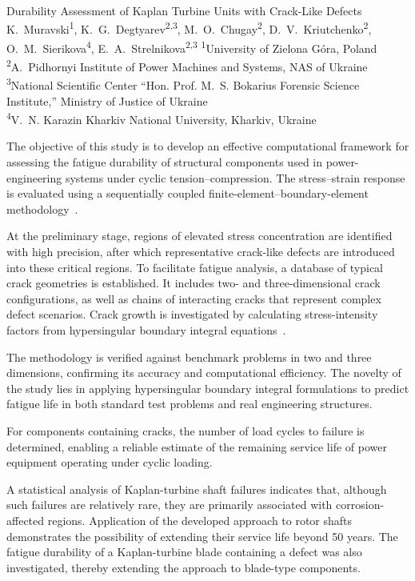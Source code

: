 \ReportHeading
  {Durability Assessment of Kaplan Turbine Units with Crack-Like Defects}
  {K.~Muravski\textsuperscript{1}, K.~G.~Degtyarev\textsuperscript{2,3}, M.~O.~Chugay\textsuperscript{2}, D.~V.~Kriutchenko\textsuperscript{2}, O.~M.~Sierikova\textsuperscript{4}, E.~A.~Strelnikova\textsuperscript{2,3}}
  {\textsuperscript{1}University of Zielona Góra, Poland\\
   \textsuperscript{2}A.~Pidhornyi Institute of Power Machines and Systems, NAS of Ukraine\\
   \textsuperscript{3}National Scientific Center ``Hon. Prof. M.~S. Bokarius Forensic Science Institute,'' Ministry of Justice of Ukraine\\
   \textsuperscript{4}V.~N. Karazin Kharkiv National University, Kharkiv, Ukraine}
  {}

The objective of this study is to develop an effective computational framework for assessing the fatigue durability of structural components used in power-engineering systems under cyclic tension--compression. The stress--strain response is evaluated using a sequentially coupled finite-element--boundary-element methodology~\cite{kaplan:sierikova2022}.

At the preliminary stage, regions of elevated stress concentration are identified with high precision, after which representative crack-like defects are introduced into these critical regions. To facilitate fatigue analysis, a database of typical crack geometries is established. It includes two- and three-dimensional crack configurations, as well as chains of interacting cracks that represent complex defect scenarios. Crack growth is investigated by calculating stress-intensity factors from hypersingular boundary integral equations~\cite{kaplan:gnitko2022}.

The methodology is verified against benchmark problems in two and three dimensions, confirming its accuracy and computational efficiency. The novelty of the study lies in applying hypersingular boundary integral formulations to predict fatigue life in both standard test problems and real engineering structures.

For components containing cracks, the number of load cycles to failure is determined, enabling a reliable estimate of the remaining service life of power equipment operating under cyclic loading.

A statistical analysis of Kaplan-turbine shaft failures indicates that, although such failures are relatively rare, they are primarily associated with corrosion-affected regions. Application of the developed approach to rotor shafts demonstrates the possibility of extending their service life beyond 50 years. The fatigue durability of a Kaplan-turbine blade containing a defect was also investigated, thereby extending the approach to blade-type components.

